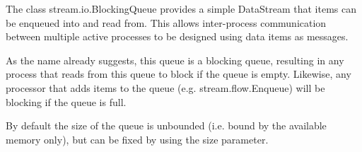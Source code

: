 
The class {\ttfamily stream.io.BlockingQueue} provides a simple
DataStream that items can be enqueued into and read from. This allows
inter-process communication between multiple active processes to be
designed using data items as messages.

As the name already suggests, this queue is a blocking queue,
resulting in any process that reads from this queue to block if the
queue is empty. Likewise, any processor that adds items to the
queue (e.g. {\ttfamily stream.flow.Enqueue}) will be blocking if
the queue is full.

By default the size of the queue is unbounded (i.e. bound by the
available memory only), but can be fixed by using the {\ttfamily size}
parameter.

\begin{table}[h]
\end{table}
